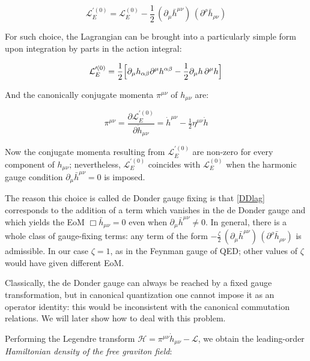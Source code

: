 \documentclass[12pt,a4paper,oneside]{article}
\numberwithin{equation}{section}   %
\begin{document}
\begin{equation} \label{DDlag}
    \mathcal{L}_E^{\prime(0)}
    = \mathcal{L}^{(0)}_E - \frac{1}{2}\, (\partial_\mu \bar{h}^{\mu\nu})\, (\partial^\rho \bar{h}_{\rho\nu})
\end{equation}

For such choice, the Lagrangian can be brought into a
particularly simple form upon integration by parts in the action integral:

\begin{equation}
    \mathcal L_E^{\prime(0)}
=\frac{1}{2}\Bigl[
\partial_\mu h_{\alpha\beta}\partial^\mu h^{\alpha\beta}
-\frac12\partial_\mu h\,\partial^\mu h\Bigr]
\end{equation}

And the canonically conjugate momenta $\pi^{\mu\nu}$ of $h_{\mu\nu}$ are:

\begin{equation}
\pi^{\mu\nu}=\frac{\partial\mathcal L_E^{\prime(0)}}{\partial\dot h_{\mu\nu}}
=\dot h^{\mu\nu}-\tfrac12\eta^{\mu\nu}\dot h
\label{pih}
\end{equation}

Now the conjugate momenta
resulting from $\mathcal{L}_E^{\prime(0)}$ are non-zero for every component
of $h_{\mu\nu}$; nevertheless, $\mathcal{L}_E^{\prime(0)}$ coincides with
$\mathcal{L}^{(0)}_E$ when the harmonic gauge condition
$\partial_\mu \bar{h}^{\mu\nu}=0$ is imposed. 

The reason this choice is called de Donder gauge fixing is that \eqref{DDlag}
corresponds to the addition of a term which vanishes in the de Donder gauge
and which yields the EoM $\Box \bar{h}_{\mu\nu} = 0$ even when
$\partial_\mu\bar{h}^{\mu\nu}\neq0$.
In general, there is a whole class of gauge-fixing terms: any term of the form
$-\frac{\zeta}{2}\, (\partial_\mu \bar{h}^{\mu\nu})\, (\partial^\rho \bar{h}_{\rho\nu})$
is admissible. In our case $\zeta=1$, as in the Feynman gauge of QED; other
values of $\zeta$ would have given different EoM.

Classically, the de Donder gauge can always be reached by a fixed gauge
transformation, but in canonical quantization
one cannot impose it as an operator identity: this
would be inconsistent with the canonical commutation relations. We will
later show how to deal with this problem.


Performing the Legendre transform $\mathcal H=\pi^{\mu\nu}\dot h_{\mu\nu}-\mathcal L$,
we obtain the leading-order \textit{Hamiltonian density of the free graviton field}:
\end{document}
